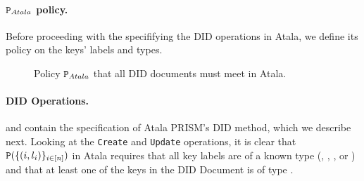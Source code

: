 \paragraph{$\P_{Atala}$ policy.} %
Before proceeding with the specififying the DID operations in Atala, we define
its policy on the keys' labels and types.

\begin{figure}[ht]
  \centering
  \caption{Policy $\P_{Atala}$ that all DID documents must meet in Atala.}
\end{figure}

\paragraph{DID Operations.} %
 and  contain the
specification of Atala PRISM's DID method,
which we describe next. Looking at the \texttt{Create} and \texttt{Update}
operations, it is clear that $\P(\lbrace (i, \lbl_i) \rbrace_{i\in[n]})$ in
Atala requires that all key labels are of a known type (\MasterKey, \IssueKey,
\CommKey, or \AuthKey) and that at least one of the keys in the DID Document
is of type \MasterKey.


